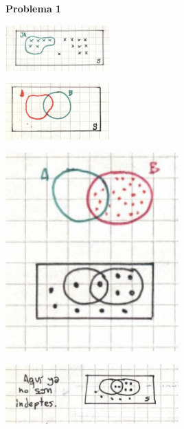 \documentclass[10pt,oneside]{CBFT_book}
\begin{document}
\begin{ejemplo}{\bf Problema 1}

\includegraphics[width=0.30\textwidth]{images/1606329144.jpg}

\includegraphics[width=0.30\textwidth]{images/1606329147.jpg}

\includegraphics[width=0.50\textwidth]{images/1606329152.jpg}

\includegraphics[width=0.50\textwidth]{images/1606329155.jpg}
 
\end{ejemplo}



\end{document}
